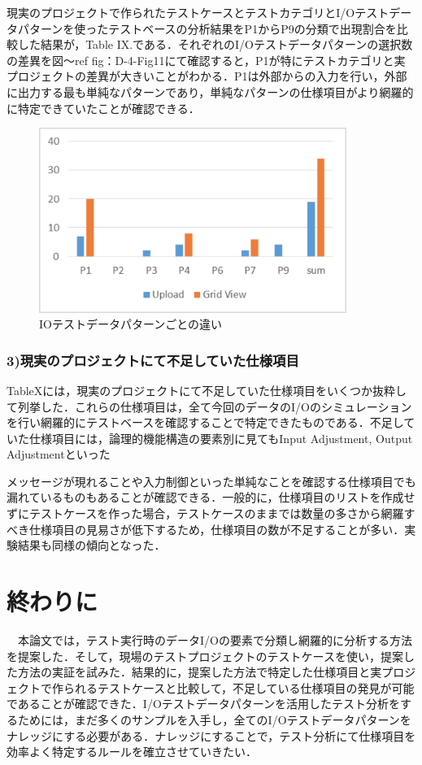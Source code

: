 \documentclass[a4paper,12pt]{jreport}
\begin{document}
現実のプロジェクトで作られたテストケースとテストカテゴリとI/Oテストデータパターンを使ったテストベースの分析結果をP1からP9の分類で出現割合を比較した結果が，Table IX.である．それぞれのI/Oテストデータパターンの選択数の差異を図〜ref {fig：D-4-Fig11}にて確認すると，P1が特にテストカテゴリと実プロジェクトの差異が大きいことがわかる．P1は外部からの入力を行い，外部に出力する最も単純なパターンであり，単純なパターンの仕様項目がより網羅的に特定できていたことが確認できる．
   \begin{figure}[htbp]
  \begin{center}
  \includegraphics[width=10cm]{./image/D-4-Fig11.png}
  \caption{IOテストデータパターンごとの違い}
  \label{fig:D-4-Fig11}
  \end{center}
   \end{figure}


\subsubsection{3)現実のプロジェクトにて不足していた仕様項目}

TableXには，現実のプロジェクトにて不足していた仕様項目をいくつか抜粋して列挙した．これらの仕様項目は，全て今回のデータのI/Oのシミュレーションを行い網羅的にテストベースを確認することで特定できたものである．不足していた仕様項目には，論理的機能構造の要素別に見てもInput Adjustment, Output Adjustmentといった

メッセージが現れることや入力制御といった単純なことを確認する仕様項目でも漏れているものもあることが確認できる．一般的に，仕様項目のリストを作成せずにテストケースを作った場合，テストケースのままでは数量の多さから網羅すべき仕様項目の見易さが低下するため，仕様項目の数が不足することが多い．実験結果も同様の傾向となった．

\section{終わりに}
　本論文では，テスト実行時のデータI/Oの要素で分類し網羅的に分析する方法を提案した．そして，現場のテストプロジェクトのテストケースを使い，提案した方法の実証を試みた．結果的に，提案した方法で特定した仕様項目と実プロジェクトで作られるテストケースと比較して，不足している仕様項目の発見が可能であることが確認できた．I/Oテストデータパターンを活用したテスト分析をするためには，まだ多くのサンプルを入手し，全てのI/Oテストデータパターンをナレッジにする必要がある．ナレッジにすることで，テスト分析にて仕様項目を効率よく特定するルールを確立させていきたい．
\end{document}
